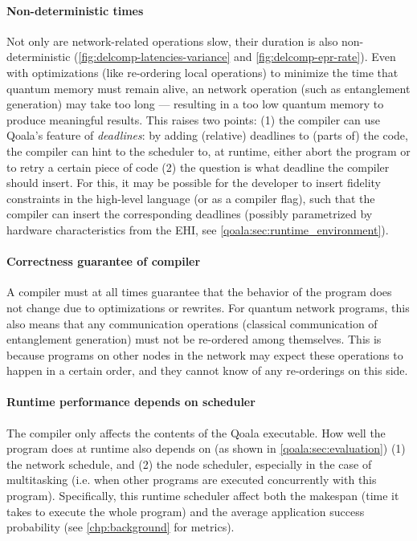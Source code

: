 \paragraph{Non-deterministic times}
Not only are network-related operations slow, their duration is also non-deterministic (\cref{fig:delcomp-latencies-variance} and \cref{fig:delcomp-epr-rate}).
Even with optimizations (like re-ordering local operations) to minimize the time that quantum memory must remain alive, an network operation (such as entanglement generation) may take too long --- resulting in a too low quantum memory to produce meaningful results.
This raises two points:
(1) the compiler can use Qoala's feature of \emph{deadlines}: by adding (relative) deadlines to (parts of) the code, the compiler can hint to the scheduler to, at runtime, either abort the program or to retry a certain piece of code
(2) the question is what deadline the compiler should insert. For this, it may be possible for the developer to insert fidelity constraints in the high-level language (or as a compiler flag), such that the compiler can insert the corresponding deadlines (possibly parametrized by hardware characteristics from the \acf{EHI}, see \cref{qoala:sec:runtime_environment}).

\paragraph{Correctness guarantee of compiler}
A compiler must at all times guarantee that the behavior of the program does not change due to optimizations or rewrites.
For quantum network programs, this also means that any communication operations (classical communication of entanglement generation) must not be re-ordered among themselves.
This is because programs on other nodes in the network may expect these operations to happen in a certain order, and they cannot know of any re-orderings on this side.

\paragraph{Runtime performance depends on scheduler}
The compiler only affects the contents of the Qoala executable.
How well the program does at runtime also depends on (as shown in \cref{qoala:sec:evaluation})
(1) the network schedule, and (2) the node scheduler, especially in the case of multitasking (i.e. when other programs are executed concurrently with this program).
Specifically, this runtime scheduler affect both the makespan (time it takes to execute the whole program) and the average application success probability (see \cref{chp:background} for metrics).

